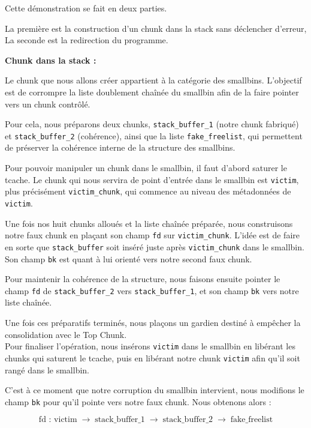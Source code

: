 Cette démonstration se fait en deux parties.

La première est la construction d'un chunk dans la stack sans déclencher d'erreur,
La seconde est la redirection du programme.

\textbf{Chunk dans la stack :}

Le chunk que nous allons créer appartient à la catégorie des smallbins.
L’objectif est de corrompre la liste doublement chaînée du smallbin afin
de la faire pointer vers un chunk contrôlé.

Pour cela, nous préparons deux chunks, \texttt{stack\_buffer\_1} (notre chunk
fabriqué) et \texttt{stack\_buffer\_2} (cohérence), ainsi que la liste
\texttt{fake\_freelist}, qui permettent de préserver la cohérence interne
de la structure des smallbins.

Pour pouvoir manipuler un chunk dans le smallbin, il faut d’abord saturer
le tcache. Le chunk qui nous servira de point d’entrée dans le smallbin est
\texttt{victim}, plus précisément \texttt{victim\_chunk}, qui commence au
niveau des métadonnées de \texttt{victim}.

Une fois nos huit chunks alloués et la liste chaînée préparée, nous
construisons notre faux chunk en plaçant son champ \texttt{fd} sur
\texttt{victim\_chunk}. L’idée est de faire en sorte que \texttt{stack\_buffer}
soit inséré juste après \texttt{victim\_chunk} dans le smallbin. Son champ
\texttt{bk} est quant à lui orienté vers notre second faux chunk.

Pour maintenir la cohérence de la structure, nous faisons ensuite pointer
le champ \texttt{fd} de \texttt{stack\_buffer\_2} vers \texttt{stack\_buffer\_1},
et son champ \texttt{bk} vers notre liste chaînée.

Une fois ces préparatifs terminés, nous plaçons un gardien destiné à
empêcher la consolidation avec le Top Chunk.\\
Pour finaliser l’opération, nous insérons \texttt{victim} dans le smallbin
en libérant les chunks qui saturent le tcache, puis en libérant notre chunk
\texttt{victim} afin qu’il soit rangé dans le smallbin.

C’est à ce moment que notre corruption du smallbin intervient, nous
modifions le champ \texttt{bk} pour qu’il pointe vers notre faux chunk.
Nous obtenons alors :



\[
       \text{fd : } \text{victim} \;\rightarrow\; \text{stack\_buffer\_1} \;\rightarrow\;
       \text{stack\_buffer\_2} \;\rightarrow\; \text{fake\_freelist}
\]





